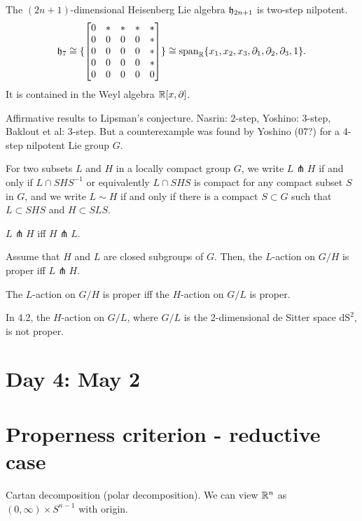 \documentclass{../../../small}
\begin{document}
\begin{ex}
The $(2n+1)$-dimensional Heisenberg Lie algebra $\fh_{2n+1}$ is two-step nilpotent.
\[\fh_7\cong\{\mat[b]{0&*&*&*&*\\0&0&0&0&*\\0&0&0&0&*\\0&0&0&0&*\\0&0&0&0&0}\}\cong\spn_\R\{x_1,x_2,x_3,\partial_1,\partial_2,\partial_3,1\}.\]
It is contained in the Weyl algebra $\R[x,\partial]$.
\end{ex}

Affirmative results to Lipsman's conjecture.
Nasrin: 2-step, Yoshino: 3-step, Baklout et al: 3-step.
But a counterexample was found by Yoshino (07?) for a 4-step nilpotent Lie group $G$.

\setcounter{thm}{13}
\begin{defn}
For two subsets $L$ and $H$ in a locally compact group $G$, we write $L\pitchfork H$ if and only if $L\cap SHS^{-1}$ or equivalently $L\cap SHS$ is compact for any compact subset $S$ in $G$, and we write $L\sim H$ if and only if there is a compact $S\subset G$ such that $L\subset SHS$ and $H\subset SLS$.
\end{defn}
\begin{lem}
$L\pitchfork H$ iff $H\pitchfork L$.
\end{lem}
\begin{prop}
Assume that $H$ and $L$ are closed subgroups of $G$.
Then, the $L$-action on $G/H$ is proper iff $L\pitchfork H$.
\end{prop}
\begin{cor}
The $L$-action on $G/H$ is proper iff the $H$-action on $G/L$ is proper.
\end{cor}

In 4.2, the $H$-action on $G/L$, where $G/L$ is the 2-dimensional de Sitter space $\mathrm{dS}^2$, is not proper.



\newpage
\setcounter{section}{3}
\section{Day 4: May 2}
\setcounter{section}{5}
\section*{Properness criterion - reductive case}

Cartan decomposition (polar decomposition).
We can view $\R^n$ as $(0,\infty)\times S^{n-1}$ with origin.
\end{document}
